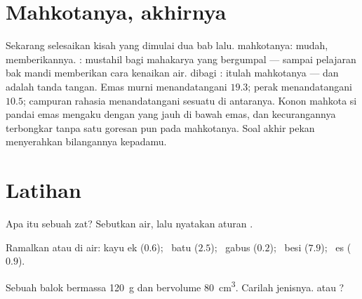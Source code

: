 \section{Mahkotanya, akhirnya}

\begin{example}\label{ex:g6:density-floating:crown}
Sekarang selesaikan kisah yang dimulai dua bab lalu.  mahkotanya:
mudah,  memberikannya. : mustahil bagi mahakarya yang
bergumpal --- sampai pelajaran bak mandi memberikan cara kenaikan air.
 dibagi : itulah \emph{} mahkotanya --- dan
 adalah tanda tangan. Emas murni menandatangani $19.3$;
perak menandatangani $10.5$; campuran rahasia menandatangani sesuatu
di antaranya. Konon mahkota si pandai emas mengaku dengan 
yang jauh di bawah  emas, dan kecurangannya terbongkar
tanpa satu goresan pun pada mahkotanya. Soal akhir pekan menyerahkan
bilangannya kepadamu.
\end{example}

\section{Latihan}

\begin{exercise}[$\star$]\label{exo:g6:density-floating:1}
Apa itu  sebuah zat? Sebutkan  air, lalu
nyatakan aturan .
\end{exercise}

\begin{exercise}[$\star$]\label{exo:g6:density-floating:2}
Ramalkan  atau  di air: kayu ek ($0.6$); \ batu
($2.5$); \ gabus ($0.2$); \ besi ($7.9$); \ es ($0.9$).
\end{exercise}

\begin{exercise}[$\star$]\label{exo:g6:density-floating:3}
Sebuah balok bermassa \qty{120}{g} dan bervolume \qty{80}{cm^3}.
Carilah  jenisnya.  atau ?
\end{exercise}

